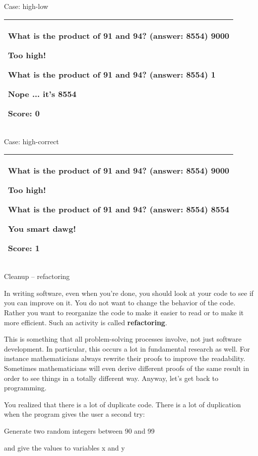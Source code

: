 \documentclass[
]{article}
\begin{document}
Case: high-low

\begin{longtable}[]{@{}l@{}}
\toprule
\endhead
\begin{minipage}[t]{0.97\columnwidth}\raggedright
What is the product of 91 and 94? (answer: 8554) \textbf{9000}

Too high!

What is the product of 91 and 94? (answer: 8554) 1

Nope ... it's 8554

Score: 0\strut
\end{minipage}\tabularnewline
\bottomrule
\end{longtable}

Case: high-correct

\begin{longtable}[]{@{}l@{}}
\toprule
\endhead
\begin{minipage}[t]{0.97\columnwidth}\raggedright
What is the product of 91 and 94? (answer: 8554) \textbf{9000}

Too high!

What is the product of 91 and 94? (answer: 8554) 8554

You smart dawg!

Score: 1\strut
\end{minipage}\tabularnewline
\bottomrule
\end{longtable}

Cleanup -- refactoring

In writing software, even when you're done, you should look at your code
to see if you can improve on it. You do not want to change the behavior
of the code. Rather you want to reorganize the code to make it easier to
read or to make it more efficient. Such an activity is called
\textbf{refactoring}.

This is something that all problem-solving processes involve, not just
software development. In particular, this occurs a lot in fundamental
research as well. For instance mathematicians always rewrite their
proofs to improve the readability. Sometimes mathematicians will even
derive different proofs of the same result in order to see things in a
totally different way. Anyway, let's get back to programming.

You realized that there is a lot of duplicate code. There is a lot of
duplication when the program gives the user a second try:

Generate two random integers between 90 and 99

and give the values to variables x and y
\end{document}
